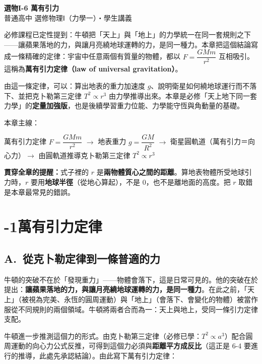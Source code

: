 \documentclass[11pt]{article}
\begin{document}
\begin{center}
{\sffamily\Huge\bfseries 選物I-6 萬有引力}\\[3pt]
{\sffamily\large 普通高中 選修物理Ⅰ（力學一）・學生講義}
\end{center}
\vspace{0.6em}

必修課程已定性提到：牛頓把「天上」與「地上」的力學統一在同一套規則之下——讓蘋果落地的力，與讓月亮繞地球運轉的力，是同一種力。本章把這個結論寫成一條精確的定律：宇宙中任意兩個有質量的物體，都以 $F=\dfrac{GMm}{r^2}$ 互相吸引。這稱為\textbf{萬有引力定律（law of universal gravitation）}。

由這一條定律，可以：算出地表的重力加速度 $g$、說明衛星如何繞地球運行而不落下、並把克卜勒第三定律 $T^2\propto r^3$ 由力學推導出來。本章是必修「天上地下同一套力學」的\textbf{定量加強版}，也是後續學習重力位能、力學能守恆與角動量的基礎。

\medskip
本章主線：

\begin{center}
萬有引力定律 $F=\dfrac{GMm}{r^2}$ $\rightarrow$ 地表重力 $g=\dfrac{GM}{R^2}$ $\rightarrow$ 衛星圓軌道（萬有引力＝向心力）$\rightarrow$ 由圓軌道推導克卜勒第三定律 $T^2\propto r^3$
\end{center}

\medskip
\textbf{貫穿全章的提醒：}式子裡的 $r$ 是\textbf{兩物體質心之間的距離}。算地表物體所受地球引力時，$r$ 要用\textbf{地球半徑}（從地心算起），不是 0，也不是離地面的高度。把 $r$ 取錯是本章最常見的錯誤。

\section*{-1\quad 萬有引力定律}

\subsection*{\sffamily A.\ 從克卜勒定律到一條普適的力}

牛頓的突破不在於「發現重力」——物體會落下，這是日常可見的。他的突破在於提出：\textbf{讓蘋果落地的力，與讓月亮繞地球運轉的力，是同一種力}。在此之前，「天上」（被視為完美、永恆的圓周運動）與「地上」（會落下、會變化的物體）被當作服從不同規則的兩個領域。牛頓將兩者合而為一：天上與地上，受同一條引力定律支配。

牛頓進一步推測這個力的形式。由克卜勒第三定律（必修已學：$T^2\propto a^3$）配合圓周運動的向心力公式反推，可得到這個力必須與\textbf{距離平方成反比}（這正是 6-4 要進行的推導，此處先承認結論）。由此寫下萬有引力定律：
\end{document}
